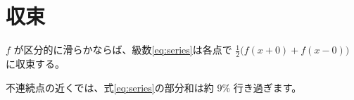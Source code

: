 \section{収束}\label{sec:convergence}
\begin{theorem}\label{thm:dirichlet}
  $f$ が区分的に滑らかならば、級数\eqref{eq:series}は各点で
  $\frac12\bigl(f(x+0)+f(x-0)\bigr)$ に収束する。
\end{theorem}
不連続点の近くでは、式\eqref{eq:series}の部分和は約 9\% 行き過ぎます。
